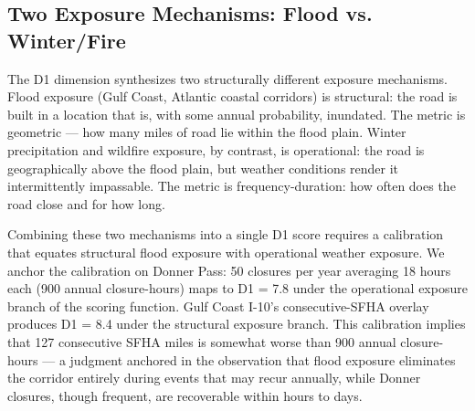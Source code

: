 \subsection{Two Exposure Mechanisms: Flood vs. Winter/Fire}

The D1 dimension synthesizes two structurally different exposure mechanisms. Flood exposure
(Gulf Coast, Atlantic coastal corridors) is structural: the road is built in a location that
is, with some annual probability, inundated. The metric is geometric --- how many miles of
road lie within the flood plain. Winter precipitation and wildfire exposure, by contrast,
is operational: the road is geographically above the flood plain, but weather conditions
render it intermittently impassable. The metric is frequency-duration: how often does the
road close and for how long.

Combining these two mechanisms into a single D1 score requires a calibration that equates
structural flood exposure with operational weather exposure. We anchor the calibration on
Donner Pass: 50 closures per year averaging 18 hours each (900 annual closure-hours) maps
to D1 = 7.8 under the operational exposure branch of the scoring function. Gulf Coast
I-10's consecutive-SFHA overlay produces D1 = 8.4 under the structural exposure branch.
This calibration implies that 127 consecutive SFHA miles is somewhat worse than 900 annual
closure-hours --- a judgment anchored in the observation that flood exposure eliminates
the corridor entirely during events that may recur annually, while Donner closures, though
frequent, are recoverable within hours to days.
